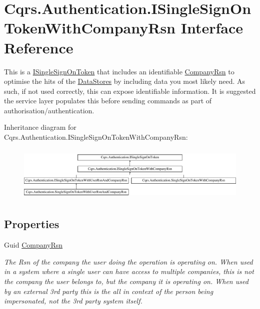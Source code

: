 \hypertarget{interfaceCqrs_1_1Authentication_1_1ISingleSignOnTokenWithCompanyRsn}{}\section{Cqrs.\+Authentication.\+I\+Single\+Sign\+On\+Token\+With\+Company\+Rsn Interface Reference}
\label{interfaceCqrs_1_1Authentication_1_1ISingleSignOnTokenWithCompanyRsn}


This is a \hyperlink{interfaceCqrs_1_1Authentication_1_1ISingleSignOnToken}{I\+Single\+Sign\+On\+Token} that includes an identifiable \hyperlink{interfaceCqrs_1_1Authentication_1_1ISingleSignOnTokenWithCompanyRsn_a26ffa6ca2e583f0ecc440b68fe3edd52_a26ffa6ca2e583f0ecc440b68fe3edd52}{Company\+Rsn} to optimise the hits of the \hyperlink{}{Data\+Stores} by including data you most likely need. As such, if not used correctly, this can expose identifiable information. It is suggested the service layer populates this before sending commands as part of authorisation/authentication.  


Inheritance diagram for Cqrs.\+Authentication.\+I\+Single\+Sign\+On\+Token\+With\+Company\+Rsn\+:\begin{figure}[H]
\begin{center}
\leavevmode
\includegraphics[height=2.692308cm]{interfaceCqrs_1_1Authentication_1_1ISingleSignOnTokenWithCompanyRsn}
\end{center}
\end{figure}
\subsection*{Properties}
\begin{DoxyCompactItemize}
\item 
Guid \hyperlink{interfaceCqrs_1_1Authentication_1_1ISingleSignOnTokenWithCompanyRsn_a26ffa6ca2e583f0ecc440b68fe3edd52_a26ffa6ca2e583f0ecc440b68fe3edd52}{Company\+Rsn}
\begin{DoxyCompactList}\small\item\em The Rsn of the company the user doing the operation is operating on. When used in a system where a single user can have access to multiple companies, this is not the company the user belongs to, but the company it is operating on. When used by an external 3rd party this is the all in context of the person being impersonated, not the 3rd party system itself. \end{DoxyCompactList}\end{DoxyCompactItemize}
